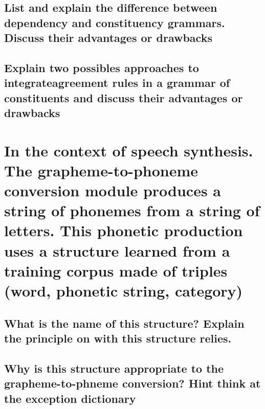 \documentclass{eplDoc}
\begin{document}
\subsection{List and explain the difference between dependency and constituency grammars. Discuss their advantages or drawbacks} 
\subsection{Explain two possibles approaches to integrateagreement rules in a grammar of constituents and discuss their advantages or drawbacks}

\section{In the context of speech synthesis.  The grapheme-to-phoneme conversion module produces a string of phonemes from a string of letters.  This phonetic production uses a structure learned from a training corpus made of triples (word, phonetic string, category)}
\subsection{What is the name of this structure? Explain the principle on with this structure relies.} 
\subsection{Why is this structure appropriate to the grapheme-to-phneme  conversion?  Hint think at the exception dictionary} 
\end{document}
